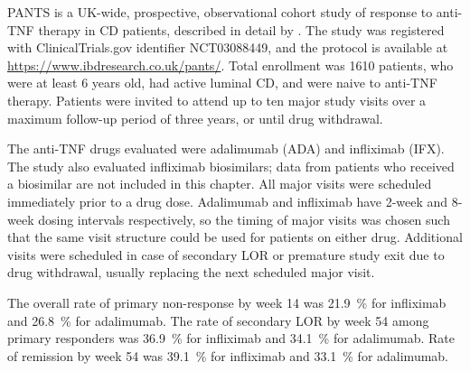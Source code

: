 \gls{PANTS} is a UK-wide, prospective, observational cohort study of response to anti-\gls{TNF} therapy in \gls{CD} patients, described in detail by \textcite{kennedy2019PredictorsAntiTNFTreatment}.
The study was registered with ClinicalTrials.gov identifier NCT03088449, and the protocol is available at \url{https://www.ibdresearch.co.uk/pants/}.
Total enrollment was 1610 patients, who were at least 6 years old, had active luminal \gls{CD}, and were naive to anti-\gls{TNF} therapy.
Patients were invited to attend up to ten major study visits over a maximum follow-up period of three years, or until drug withdrawal.

The anti-\gls{TNF} drugs evaluated were adalimumab (ADA) and infliximab (IFX).
The study also evaluated infliximab biosimilars; data from patients who received a biosimilar are not included in this chapter.
All major visits were scheduled immediately prior to a drug dose.
Adalimumab and infliximab have 2-week and 8-week dosing intervals respectively, so the timing of major visits was chosen such that the same visit structure could be used for patients on either drug.
Additional visits were scheduled in case of secondary \gls{LOR} or premature study exit due to drug withdrawal, usually replacing the next scheduled major visit.

The overall rate of primary non-response by week 14 was \SI[round-precision=1]{21.9}{\percent} for infliximab and \SI[round-precision=1]{26.8}{\percent} for adalimumab.
The rate of secondary \gls{LOR} by week 54 among primary responders was \SI[round-precision=1]{36.9}{\percent} for infliximab and \SI[round-precision=1]{34.1}{\percent} for adalimumab.
Rate of remission by week 54 was \SI[round-precision=1]{39.1}{\percent} for infliximab and \SI[round-precision=1]{33.1}{\percent} for adalimumab.

